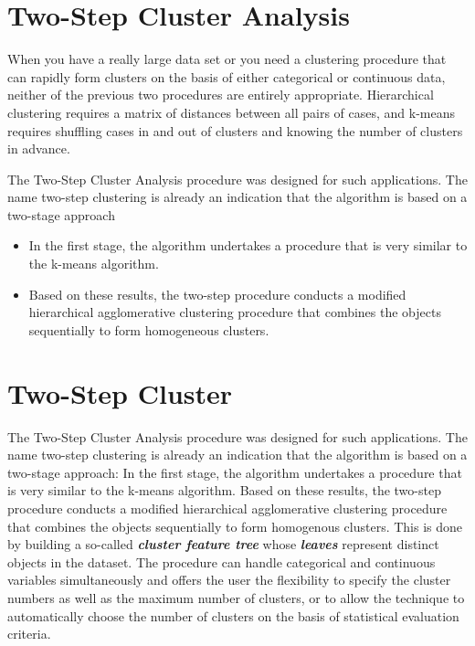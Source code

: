 \documentclass[a4paper,12pt]{article}
\begin{document}
\tableofcontents

\section{Two-Step Cluster Analysis}

When you have a really large data set or you need a clustering procedure that can rapidly form clusters on the basis of either categorical or continuous data, neither of the previous two procedures are entirely appropriate. Hierarchical clustering requires a matrix of distances between all pairs of cases, and k-means requires shuffling cases in and out of clusters and knowing the number of clusters in advance.

The Two-Step Cluster Analysis procedure was designed for such applications. The name two-step clustering is already an indication that the algorithm is based on a two-stage approach
\begin{itemize}
\item In the first stage, the algorithm undertakes a procedure that is very similar to the k-means algorithm. \item Based on these results, the two-step
procedure conducts a modified hierarchical agglomerative clustering procedure that
combines the objects sequentially to form homogeneous clusters.
\end{itemize}

\section{Two-Step Cluster}


The Two-Step Cluster Analysis procedure was designed for such applications. The name two-step clustering is already an indication that the algorithm is based on a two-stage approach: In the first stage, the algorithm undertakes a procedure that is very similar to the k-means algorithm. Based on these results, the two-step
procedure conducts a modified hierarchical agglomerative clustering procedure that
combines the objects sequentially to form homogenous clusters. This is done by
building a so-called \textbf{\textit{cluster feature tree}} whose \textbf{\textit{leaves}} represent distinct objects in the dataset. The procedure can handle categorical and continuous variables simultaneously
and offers the user the flexibility to specify the cluster numbers as well as
the maximum number of clusters, or to allow the technique to automatically choose
the number of clusters on the basis of statistical evaluation criteria.
\end{document}
